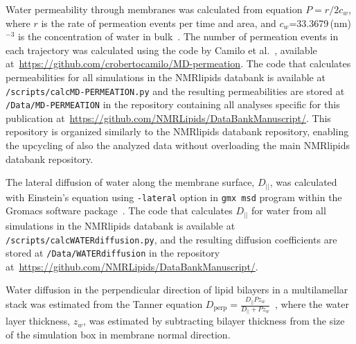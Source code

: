 \documentclass[fleqn,10pt]{wlscirep}
\begin{document}
Water permeability through membranes was calculated from equation $P=r/2c_w$, where $r$ is the rate of permeation events per time and area, and $c_w$=33.3679\,(nm)$^{-3}$ is the concentration of water in bulk~\cite{venable19}. The number of permeation events in each trajectory was calculated using the code by Camilo et al.~\cite{camilo2022}, available at~\url{https://github.com/crobertocamilo/MD-permeation}. 
The code that calculates permeabilities for all simulations in the NMRlipids databank is available at \texttt{/scripts/calcMD-PERMEATION.py} and the resulting permeabilities are stored at \texttt{/Data/MD-PERMEATION} in the repository containing all analyses specific for this publication at~\url{https://github.com/NMRLipids/DataBankManuscript/}. 
This repository is organized similarly to the NMRlipids databank repository, enabling the upcycling of also the analyzed data without overloading the main NMRlipids databank repository. 

The lateral diffusion of water along the membrane surface, $D_{||}$, was calculated with Einstein's equation using \texttt{-lateral} option in \texttt{gmx msd} program within the Gromacs software package~\cite{gromacsMANUAL}. The code that calculates $D_{||}$ for water from all simulations in the NMRlipids databank is available at \texttt{/scripts/calcWATERdiffusion.py}, and the resulting diffusion coefficients are stored at \texttt{/Data/WATERdiffusion} in the repository at~\url{https://github.com/NMRLipids/DataBankManuscript/}.

Water diffusion in the perpendicular direction of lipid bilayers in a multilamellar stack was estimated from the Tanner equation $D_\mathrm{perp} = \frac{D_{||} P z_w}{D_{||} + P z_w}$~\cite{tanner78,wasterby02}, where the water layer thickness, $z_w$, was estimated by subtracting bilayer thickness from the size of the simulation box in membrane normal direction.
\end{document}
